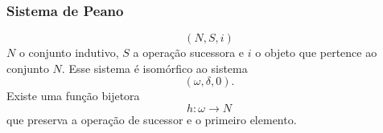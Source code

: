       \subsubsection{Sistema de Peano}
         $$(N, S, i)$$
         $N$ o conjunto indutivo, $S$ a operação sucessora e $i$ o objeto que
         pertence ao conjunto $N$. Esse sistema é isomórfico ao sistema
         $$(\omega,\delta,0).$$ Existe uma função bijetora $$h: \omega \to N$$
         que preserva a operação de sucessor e o primeiro elemento.
